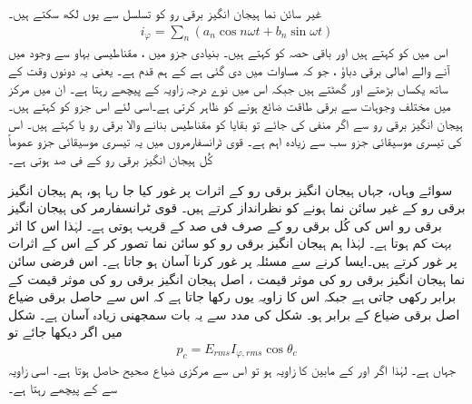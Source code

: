 غیر سائن نما ہیجان انگیز برقی رو  کو  تسلسل سے یوں لکھ سکتے ہیں۔
\begin{align} 
i_{\varphi}=\sum_n {\left( a_n \cos n \omega t + b_n \sin \omega t \right)}
\end{align}
اس میں  کو  کہتے ہیں اور باقی حصہ کو    کہتے ہیں۔ بنیادی جزو میں ، مقناطیسی بہاو سے وجود میں آنے والے امالی برقی دباؤ  ،  جو کہ مساوات  میں دی گئی ہے کے ہم قدم ہے۔ یعنی  یہ دونوں وقت کے ساتھ یکساں بڑھتے اور گھٹتے ہیں جبکہ اس میں  نوے درجہ زاویہ   کے پیچھے رہتا ہے۔ ان میں   مرکز میں مختلف وجوہات سے برقی طاقت ضائع ہونے کو ظاہر  کرتی ہے۔اسی لئے اس جزو کو   کہتے ہیں۔ہیجان انگیز برقی رو  سے اگر  منفی کی جائے تو بقایا کو مقناطیس بنانے والا برقی رو یا  کہتے ہیں۔ اس  کی تیسری موسیقائی جزو سب سے زیادہ اہم  ہے۔ قوی  ٹرانسفارمروں میں یہ تیسری موسیقائی جزو عموماً  کُل ہیجان انگیز برقی رو  کے  فی صد ہوتی ہے۔  

سوائے وہاں، جہاں  ہیجان انگیز برقی رو کے اثرات پر غور کیا جا رہا ہو، ہم ہیجان انگیز برقی رو کے غیر سائن نما ہونے کو نظرانداز کرتے ہیں۔ قوی ٹرانسفارمر کی  ہیجان انگیز برقی رو اس کی کُل برقی رو کے صرف   فی صد کے قریب ہوتی ہے۔ لہٰذا  اس کا اثر بہت کم ہوتا ہے۔ لہٰذا ہم  ہیجان انگیز برقی رو کو سائن نما تصور کر کے اس کے اثرات پر غور کرتے ہیں۔ایسا کرنے سے مسئلہ پر غور کرنا آسان ہو جاتا ہے۔ اس فرضی سائن نما  ہیجان انگیز برقی رو   کی موثر قیمت  ، اصل  ہیجان انگیز برقی رو کی موثر قیمت کے برابر رکھی جاتی ہے جبکہ اس کا زاویہ  یوں رکھا جاتا ہے کہ اس سے حاصل برقی ضیاع اصل برقی ضیاع کے برابر ہو۔ شکل   کی مدد سے یہ بات سمجھنی زیادہ آسان ہے۔ شکل میں اگر دیکھا جائے تو
\begin{align}
p_c=E_{rms} I_{\varphi,rms} \cos \theta_c
\end{align}
جہاں    ہے۔ لہٰذا  اگر  اور  کے مابین  کا زاویہ ہو تو اس سے مرکزی ضیاع صحیح حاصل ہوتا ہے۔ اسی زاویہ  سے    کے پیچھے رہتا ہے۔

